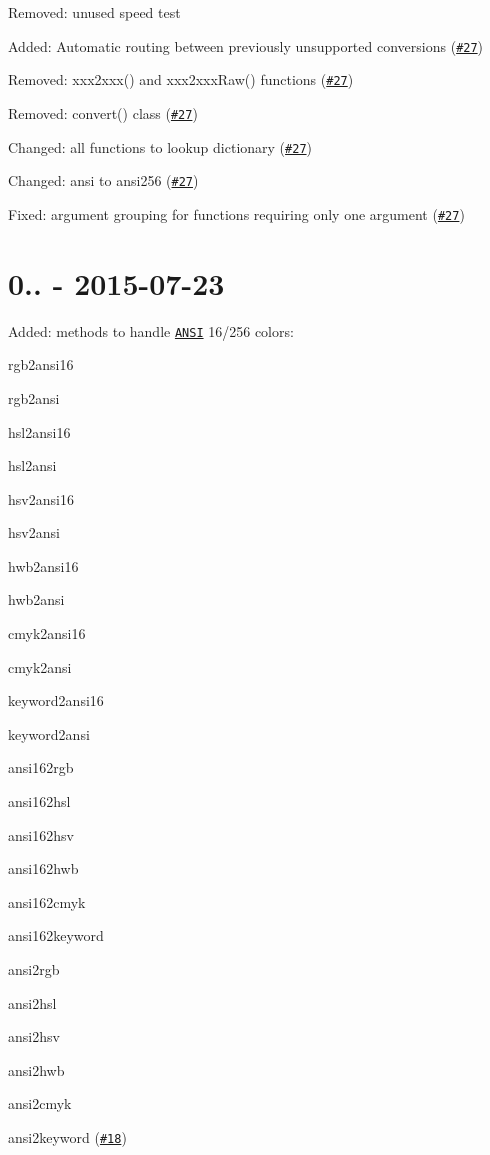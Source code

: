 
\begin{DoxyItemize}
\item Removed\+: unused speed test
\item Added\+: Automatic routing between previously unsupported conversions (\href{https://github.com/Qix-/color-convert/pull/27}{\tt \#27})
\item Removed\+: {\ttfamily xxx2xxx()} and {\ttfamily xxx2xxx\+Raw()} functions (\href{https://github.com/Qix-/color-convert/pull/27}{\tt \#27})
\item Removed\+: {\ttfamily convert()} class (\href{https://github.com/Qix-/color-convert/pull/27}{\tt \#27})
\item Changed\+: all functions to lookup dictionary (\href{https://github.com/Qix-/color-convert/pull/27}{\tt \#27})
\item Changed\+: {\ttfamily ansi} to {\ttfamily ansi256} (\href{https://github.com/Qix-/color-convert/pull/27}{\tt \#27})
\item Fixed\+: argument grouping for functions requiring only one argument (\href{https://github.com/Qix-/color-convert/pull/27}{\tt \#27})
\end{DoxyItemize}

\section*{0.. -\/ 2015-\/07-\/23}


\begin{DoxyItemize}
\item Added\+: methods to handle \href{https://en.wikipedia.org/wiki/ANSI_escape_code#Colors}{\tt A\+N\+SI} 16/256 colors\+:
\begin{DoxyItemize}
\item rgb2ansi16
\item rgb2ansi
\item hsl2ansi16
\item hsl2ansi
\item hsv2ansi16
\item hsv2ansi
\item hwb2ansi16
\item hwb2ansi
\item cmyk2ansi16
\item cmyk2ansi
\item keyword2ansi16
\item keyword2ansi
\item ansi162rgb
\item ansi162hsl
\item ansi162hsv
\item ansi162hwb
\item ansi162cmyk
\item ansi162keyword
\item ansi2rgb
\item ansi2hsl
\item ansi2hsv
\item ansi2hwb
\item ansi2cmyk
\item ansi2keyword (\href{https://github.com/harthur/color-convert/pull/18}{\tt \#18})
\end{DoxyItemize}
\end{DoxyItemize}

